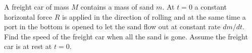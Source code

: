 \documentclass[12pt,letterpaper]{hmcpset}
\begin{document}
\clearpage


\begin{problem}
  A freight car of mass $M$ contains a mass of sand $m$. At $t = 0$ a constant
  horizontal force $R$ is applied in the direction of rolling and at the same
  time a port in the bottom is opened to let the sand flow out at constant rate
  $dm/dt$. Find the speed of the freight car when all the sand is gone. Assume
  the freight car is at rest at $t = 0$.
\end{problem}
\begin{solution}
    \vfill
\end{solution}
\end{document}
